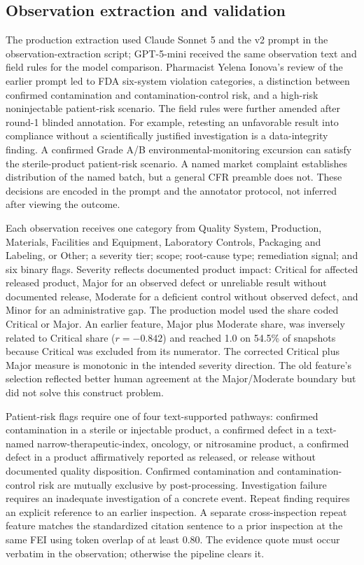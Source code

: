 \documentclass[12pt]{article}
\begin{document}
\subsection{Observation extraction and validation}

The production extraction used Claude Sonnet 5 and the v2 prompt in
the observation-extraction script; GPT-5-mini received the
same observation text and field rules for the model comparison. Pharmacist
Yelena Ionova's review of the earlier prompt led to FDA six-system
violation categories, a distinction between confirmed contamination and
contamination-control risk, and a high-risk noninjectable patient-risk
scenario. The field rules were further amended after round-1 blinded
annotation. For example, retesting an unfavorable result into compliance
without a scientifically justified investigation is a data-integrity
finding. A confirmed Grade A/B environmental-monitoring excursion can
satisfy the sterile-product patient-risk scenario. A named market
complaint establishes distribution of the named batch, but a general
CFR preamble does not. These decisions are encoded in the prompt and
the annotator protocol, not inferred after viewing the outcome.

Each observation receives one category from Quality System, Production,
Materials, Facilities and Equipment, Laboratory Controls, Packaging and
Labeling, or Other; a severity tier; scope; root-cause type; remediation
signal; and six binary flags. Severity reflects documented product impact:
Critical for affected released product, Major for an observed defect or
unreliable result without documented release, Moderate for a deficient
control without observed defect, and Minor for an administrative gap.
The production model used the share coded Critical or Major. An earlier
feature, Major plus Moderate share, was inversely related to Critical
share ($r=-0.842$) and reached 1.0 on 54.5\% of snapshots because
Critical was excluded from its numerator. The corrected Critical plus
Major measure is monotonic in the intended severity direction. The
old feature's selection reflected better human agreement at the
Major/Moderate boundary but did not solve this construct problem.

Patient-risk flags require one of four text-supported pathways: confirmed
contamination in a sterile or injectable product, a confirmed defect in a
text-named narrow-therapeutic-index, oncology, or nitrosamine product,
a confirmed defect in a product affirmatively reported as released, or
release without documented quality disposition. Confirmed contamination
and contamination-control risk are mutually exclusive by post-processing.
Investigation failure requires an inadequate investigation of a concrete
event. Repeat finding requires an explicit reference to an earlier
inspection. A separate cross-inspection repeat feature matches the
standardized citation sentence to a prior inspection at the same FEI
using token overlap of at least 0.80. The evidence quote must occur
verbatim in the observation; otherwise the pipeline clears it.
\end{document}
